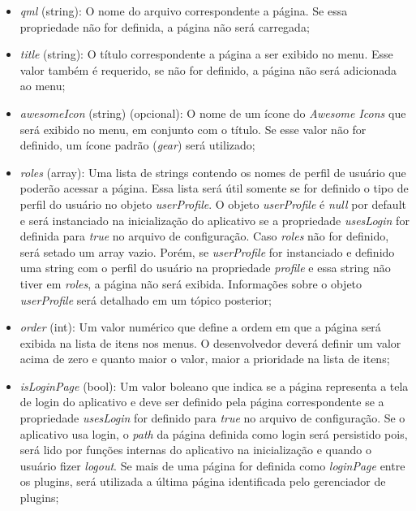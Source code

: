 \begin{itemize}
	\item \textit{qml} (string): O nome do arquivo correspondente a página. Se essa propriedade não for definida, a página não será carregada;

	\item \textit{title} (string): O título correspondente a página a ser exibido no menu. Esse valor também é requerido, se não for definido, a página não será adicionada ao menu;

	\item \textit{awesomeIcon} (string) (opcional): O nome de um ícone do \textit{Awesome Icons} que será exibido no menu, em conjunto com o título. Se esse valor não for definido, um ícone padrão (\textit{gear}) será utilizado;

	\item \textit{roles} (array): Uma lista de strings contendo os nomes de perfil de usuário que poderão acessar a página. Essa lista será útil somente se for definido o tipo de perfil do usuário no objeto \textit{userProfile}. O objeto \textit{userProfile} é \textit{null} por default e será instanciado na inicialização do aplicativo se a propriedade \textit{usesLogin} for definida para \textit{true} no arquivo de configuração. Caso \textit{roles} não for definido, será setado um array vazio. Porém, se \textit{userProfile} for instanciado e definido uma string com o perfil do usuário na propriedade \textit{profile} e essa string não tiver em \textit{roles}, a página não será exibida. Informações sobre o objeto \textit{userProfile} será detalhado em um tópico posterior;

	\item \textit{order} (int): Um valor numérico que define a ordem em que a página será exibida na lista de itens nos menus. O desenvolvedor deverá definir um valor acima de zero e quanto maior o valor, maior a prioridade na lista de itens;

	\item \textit{isLoginPage} (bool): Um valor boleano que indica se a página representa a tela de login do aplicativo e deve ser definido pela página correspondente se a propriedade \textit{usesLogin} for definido para \textit{true} no arquivo de configuração. Se o aplicativo usa login, o \textit{path} da página definida como login será persistido pois, será lido por funções internas do aplicativo na inicialização e quando o usuário fizer \textit{logout}. Se mais de uma página for definida como \textit{loginPage} entre os plugins, será utilizada a última página identificada pelo gerenciador de plugins;


\end{itemize}
